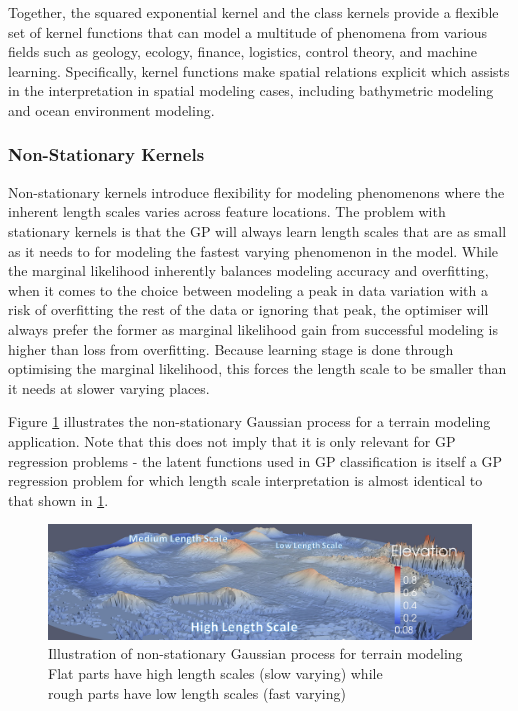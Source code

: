 				Together, the squared exponential kernel and the \matern class kernels provide a flexible set of kernel functions that can model a multitude of phenomena from various fields such as geology, ecology, finance, logistics, control theory, and machine learning. Specifically, kernel functions make spatial relations explicit which assists in the interpretation in spatial modeling cases, including bathymetric modeling and ocean environment modeling.
			
			\subsubsection{Non-Stationary Kernels}
				
				Non-stationary kernels introduce flexibility for modeling phenomenons where the inherent length scales varies across feature locations. The problem with stationary kernels is that the GP will always learn length scales that are as small as it needs to for modeling the fastest varying phenomenon in the model. While the marginal likelihood inherently balances modeling accuracy and overfitting, when it comes to the choice between modeling a peak in data variation with a risk of overfitting the rest of the data or ignoring that peak, the optimiser will always prefer the former as marginal likelihood gain from successful modeling is higher than loss from overfitting. Because learning stage is done through optimising the marginal likelihood, this forces the length scale to be smaller than it needs at slower varying places.

				Figure \ref{Background:GaussianProcess:Figure:gaussianprocesslengthscale} illustrates the non-stationary Gaussian process for a terrain modeling application. Note that this does not imply that it is only relevant for GP regression problems - the latent functions used in GP classification is itself a GP regression problem for which length scale interpretation is almost identical to that shown in \cref{Background:GaussianProcess:Figure:gaussianprocesslengthscale}.
				
				\begin{figure}[!htbp]
					\centering
						\includegraphics[width=\textwidth]{Figures/gaussianprocesslengthscale.png}
					\caption{Illustration of non-stationary Gaussian process for terrain modeling \citep{GaussianProcessTerrainFigure} \\
					Flat parts have high length scales (slow varying) while \\ rough parts have low length scales (fast varying)}
					\label{Background:GaussianProcess:Figure:gaussianprocesslengthscale}
				\end{figure}
				
